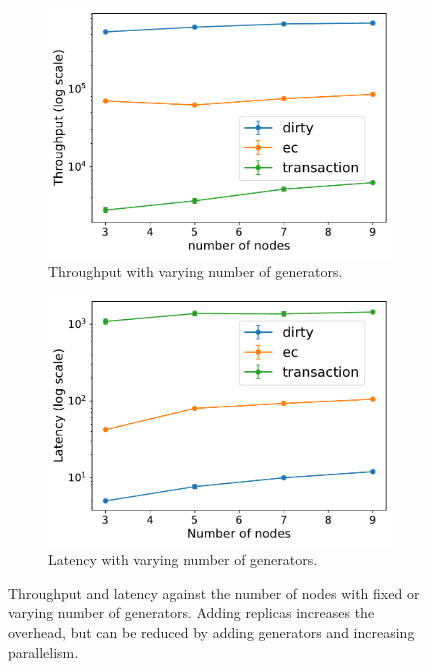 \begin{figure}[htp]
  \centering
  \begin{subfigure}[t]{0.95\columnwidth}
    \centering
    \includegraphics[width=\columnwidth]{figures/tp_nodes_caelum.pdf}
    \caption{Throughput with varying number of generators.}
    \label{fig:tp nodes caelum}
  \end{subfigure}
  
  \begin{subfigure}[t]{0.95\columnwidth}
    \centering
    \includegraphics[width=\columnwidth]{figures/lat_nodes_caelum.pdf}
    \caption{Latency with varying number of generators.}
    \label{fig:lat nodes caelum}
  \end{subfigure}
  \caption{Throughput and latency against the number of nodes with fixed or
  varying number of generators. Adding replicas increases the overhead, but can be
  reduced by adding generators and increasing parallelism.}
  \label{fig:nodes caelum}

\end{figure}


